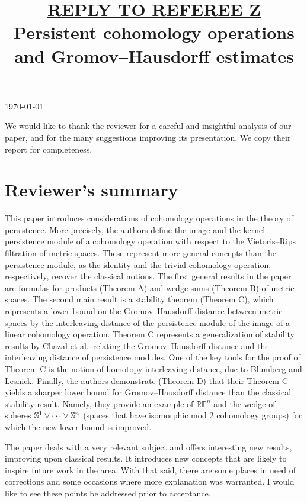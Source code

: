 \documentclass{amsart}
\title[Referee reply]{\underline{REPLY TO REFEREE Z} \\ \medskip Persistent cohomology operations \\ and Gromov--Hausdorff estimates}
\begin{document}
	\noindent\today
	\maketitle

	We would like to thank the reviewer for a careful and insightful analysis of our paper, and for the many suggestions improving its presentation.
	We copy their report for completeness.

	\section{Reviewer's summary}

	This paper introduces considerations of cohomology operations in the theory of persistence.
	More precisely, the authors define the image and the kernel persistence module of a cohomology operation with respect to the Vietoris--Rips filtration of metric spaces.
	These represent more general concepts than the persistence module, as the identity and the trivial cohomology operation, respectively, recover the classical notions.
	The first general results in the paper are formulas for products (Theorem A) and wedge sums (Theorem B) of metric spaces.
	The second main result is a stability theorem (Theorem C), which represents a lower bound on the Gromov--Hausdorff distance between metric spaces by the interleaving distance of the persistence module of the image of a linear cohomology operation.
	Theorem C represents a generalization of stability results by Chazal et al.\ relating the Gromov--Hausdorff distance and the interleaving distance of persistence modules.
	One of the key tools for the proof of Theorem C is the notion of homotopy interleaving distance, due to Blumberg and Lesnick.
	Finally, the authors demonstrate (Theorem D) that their Theorem C yields a sharper lower bound for Gromov--Hausdorff distance than the classical stability result.
	Namely, they provide an example of $\mathbb{RP}^n$ and the wedge of spheres $\mathbb{S}^1 \vee \cdots \vee \mathbb{S}^n$ (spaces that have isomorphic mod $2$ cohomology groups) for which the new lower bound is improved.

	The paper deals with a very relevant subject and offers interesting new results, improving upon classical results.
	It introduces new concepts that are likely to inspire future work in the area.
	With that said, there are some places in need of corrections and some occasions where more explanation was warranted.
	I would like to see these points be addressed prior to acceptance.
\end{document}
